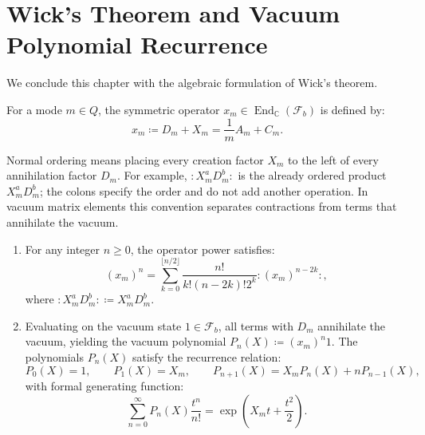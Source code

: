 \section{Wick's Theorem and Vacuum Polynomial Recurrence}

We conclude this chapter with the algebraic formulation of Wick's theorem.

\begin{definition}
For a mode $m \in Q$, the symmetric operator $x_m\in\operatorname{End}_{\mathbb C}(\mathcal F_b)$ is defined by:
\begin{equation}
x_m \coloneqq D_m + X_m = \frac{1}{m} A_m + C_m.
\end{equation}
\end{definition}

\begin{theorem}
\label{thm:wick}
Normal ordering means placing every creation factor $X_m$ to the left of every annihilation factor $D_m$. For example, $:X_m^aD_m^b:$ is the already ordered product $X_m^aD_m^b$; the colons specify the order and do not add another operation. In vacuum matrix elements this convention separates contractions from terms that annihilate the vacuum.
\begin{enumerate}
    \item For any integer $n \ge 0$, the operator power satisfies:
    \begin{equation}
    (x_m)^n = \sum_{k=0}^{\lfloor n/2 \rfloor} \frac{n!}{k! (n - 2k)! 2^k} :(x_m)^{n-2k}:,
    \end{equation}
    where $:\! X_m^a D_m^b \!: \coloneqq X_m^a D_m^b$.
    \item Evaluating on the vacuum state $1 \in \mathcal{F}_b$, all terms with $D_m$ annihilate the vacuum, yielding the vacuum polynomial $P_n(X) \coloneqq (x_m)^n 1$.
    The polynomials $P_n(X)$ satisfy the recurrence relation:
    \begin{equation}
    P_0(X) = 1, \qquad P_1(X) = X_m, \qquad P_{n+1}(X) = X_m P_n(X) + n P_{n-1}(X),
    \end{equation}
    with formal generating function:
    \begin{equation}
    \sum_{n=0}^\infty P_n(X) \frac{t^n}{n!} = \exp\left( X_m t + \frac{t^2}{2} \right).
    \end{equation}
\end{enumerate}
\end{theorem}

